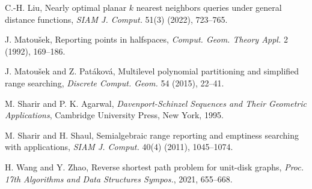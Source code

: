 \documentclass[11pt]{article}
\theoremstyle{definition}
\begin{document}
\begin{thebibliography}{}
C.-H. Liu,
Nearly optimal planar $k$ nearest neighbors queries under general distance functions,
{\it SIAM J. Comput.} 51(3) (2022), 723--765.

J. Matou\v{s}ek,
Reporting points in halfspaces,
{\it Comput. Geom. Theory Appl.} 2 (1992), 169--186.

J. Matou\v{s}ek and Z. Pat\'akov\'a,
Multilevel polynomial partitioning and simplified range searching,
{\it Discrete Comput. Geom.} 54 (2015), 22--41.

M. Sharir and P. K. Agarwal,
{\it Davenport-Schinzel Sequences and Their Geometric Applications},
Cambridge University Press, New York, 1995.

M. Sharir and H. Shaul,
Semialgebraic range reporting and emptiness searching with applications,
{\it SIAM J. Comput.} 40(4) (2011), 1045--1074.

H. Wang and Y. Zhao,
Reverse shortest path problem for unit-disk graphs,
{\it Proc. 17th Algorithms and Data Structures Sympos.}, 2021, 655--668.



\end{thebibliography}
\end{document}
